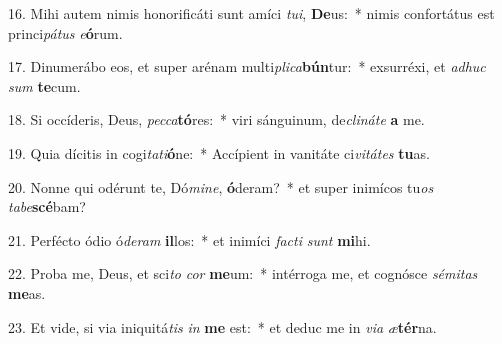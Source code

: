 16. Mihi autem nimis honorificáti sunt amíci \textit{tu}\textit{i}, \textbf{De}us:~*  nimis confortátus est princi\textit{pá}\textit{tus} \textit{e}\textbf{ó}rum.\

17. Dinumerábo eos, et super arénam multi\textit{pli}\textit{ca}\textbf{bún}tur:~*  exsurréxi, et \textit{ad}\textit{huc} \textit{sum} \textbf{te}cum.\

18. Si occíderis, Deus, \textit{pec}\textit{ca}\textbf{tó}res:~*  viri sánguinum, de\textit{cli}\textit{ná}\textit{te} \textbf{a} me.\

19. Quia dícitis in cogi\textit{ta}\textit{ti}\textbf{ó}ne:~*  Accípient in vanitáte ci\textit{vi}\textit{tá}\textit{tes} \textbf{tu}as.\

20. Nonne qui odérunt te, Dó\textit{mi}\textit{ne}, \textbf{ó}deram?~*  et super inimícos tu\textit{os} \textit{ta}\textit{be}\textbf{scé}bam?\

21. Perfécto ódio ó\textit{de}\textit{ram} \textbf{il}los:~*  et inimíci \textit{fac}\textit{ti} \textit{sunt} \textbf{mi}hi.\

22. Proba me, Deus, et sci\textit{to} \textit{cor} \textbf{me}um:~*  intérroga me, et cognósce \textit{sé}\textit{mi}\textit{tas} \textbf{me}as.\

23. Et vide, si via iniquitá\textit{tis} \textit{in} \textbf{me} est:~*  et deduc me in \textit{vi}\textit{a} \textit{æ}\textbf{tér}na.\

